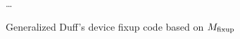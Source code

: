 \begin{figure}[H]
    \begin{algorithmic}
        \Switch{$\Mfixup$}
                \State {}
            \EndCase
                \State {}
            \EndCase
            \State \ldots
                \State {}
            \EndCase
        \EndSwitch
    \end{algorithmic}
    \caption{Generalized Duff's device fixup code based on $\Mfixup$}
    \label{fig:impl:fixup:duff:fixup-M_fixup}
\end{figure}